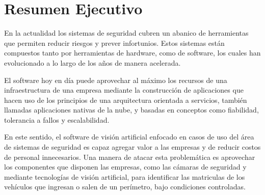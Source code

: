 \chapter*{Resumen Ejecutivo}
\thispagestyle{first-pages}
En la actualidad los sistemas de seguridad cubren un abanico de herramientas que permiten reducir riesgos y prever infortunios. Estos sistemas están compuestos tanto por herramientas de hardware, como de software, los cuales han evolucionado a lo largo de los años de manera acelerada.

El software hoy en día puede aprovechar al máximo los recursos de una infraestructura de una empresa mediante la construcción de aplicaciones que hacen uso de los principios de una arquitectura orientada a servicios, también llamadas aplicaciones nativas de la nube, y basadas en conceptos como fiabilidad, tolerancia a fallos y escalabilidad. 

En este sentido, el software de visión artificial enfocado en casos de uso del área de sistemas de seguridad es capaz agregar valor a las empresas y de reducir costos de personal innecesarios. Una manera de atacar esta problemática es aprovechar los componentes que disponen las empresas, como las cámaras de seguridad y mediante tecnologías de visión artificial, para identificar las matriculas de los vehículos que ingresan o salen de un perímetro, bajo condiciones controladas.


\renewcommand{\baselinestretch}{1.6} 
\pagebreak